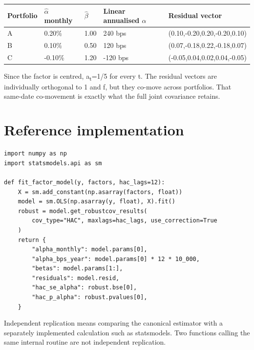 \begin{longtable}[]{@{}p{}p{}p{}p{}p{}@{}}
\toprule\noalign{}
Portfolio & \ensuremath{\hat{\alpha }} monthly & \ensuremath{\hat{\beta }} & Linear annualised \ensuremath{\alpha } & Residual vector \\
\midrule\noalign{}
\endhead
\bottomrule\noalign{}
\endlastfoot
A & 0.20\% & 1.00 & 240 bps & (0.10,-0.20,0.20,-0.20,0.10) \\
B & 0.10\% & 0.50 & 120 bps & (0.07,-0.18,0.22,-0.18,0.07) \\
C & -0.10\% & 1.20 & -120 bps & (-0.05,0.04,0.02,0.04,-0.05) \\
\end{longtable}

Since the factor is centred, a\textsubscript{t}=1/5 for every t. The
residual vectors are individually orthogonal to 1 and f, but they
co-move across portfolios. That same-date co-movement is exactly what
the full joint covariance retains.

\hypertarget{reference-implementation}{%
\section{Reference implementation}\label{reference-implementation}}

\begin{verbatim}
import numpy as np
import statsmodels.api as sm

def fit_factor_model(y, factors, hac_lags=12):
    X = sm.add_constant(np.asarray(factors, float))
    model = sm.OLS(np.asarray(y, float), X).fit()
    robust = model.get_robustcov_results(
        cov_type="HAC", maxlags=hac_lags, use_correction=True
    )
    return {
        "alpha_monthly": model.params[0],
        "alpha_bps_year": model.params[0] * 12 * 10_000,
        "betas": model.params[1:],
        "residuals": model.resid,
        "hac_se_alpha": robust.bse[0],
        "hac_p_alpha": robust.pvalues[0],
    }
\end{verbatim}

Independent replication means comparing the canonical estimator with a
separately implemented calculation such as statsmodels. Two functions
calling the same internal routine are not independent replication.

